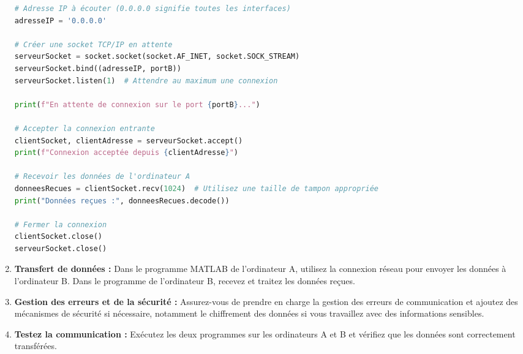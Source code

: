 \begin{enumerate}
\begin{lstlisting}[language=Python, caption={Programme Python sur l'ordinateur B (le récepteur)}]
# Adresse IP à écouter (0.0.0.0 signifie toutes les interfaces)
adresseIP = '0.0.0.0'

# Créer une socket TCP/IP en attente
serveurSocket = socket.socket(socket.AF_INET, socket.SOCK_STREAM)
serveurSocket.bind((adresseIP, portB))
serveurSocket.listen(1)  # Attendre au maximum une connexion

print(f"En attente de connexion sur le port {portB}...")

# Accepter la connexion entrante
clientSocket, clientAdresse = serveurSocket.accept()
print(f"Connexion acceptée depuis {clientAdresse}")

# Recevoir les données de l'ordinateur A
donneesRecues = clientSocket.recv(1024)  # Utilisez une taille de tampon appropriée
print("Données reçues :", donneesRecues.decode())

# Fermer la connexion
clientSocket.close()
serveurSocket.close()
\end{lstlisting}




    \item \textbf{Transfert de données :} Dans le programme MATLAB de l'ordinateur A, utilisez la connexion réseau pour envoyer les données à l'ordinateur B. Dans le programme de l'ordinateur B, recevez et traitez les données reçues.

    \item \textbf{Gestion des erreurs et de la sécurité :} Assurez-vous de prendre en charge la gestion des erreurs de communication et ajoutez des mécanismes de sécurité si nécessaire, notamment le chiffrement des données si vous travaillez avec des informations sensibles.

    \item \textbf{Testez la communication :} Exécutez les deux programmes sur les ordinateurs A et B et vérifiez que les données sont correctement transférées.
\end{enumerate}


%

